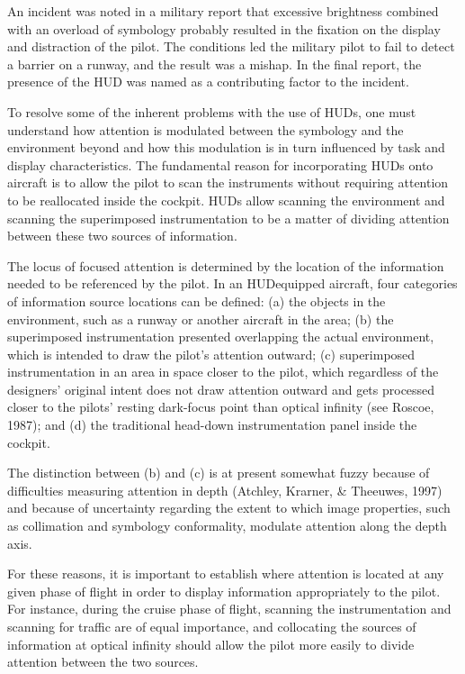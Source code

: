 \documentclass[utf8,bachelor,manualbib]{gradu3}
\begin{document}
An incident was noted in a military report that excessive brightness combined with an overload of symbology probably resulted in the fixation on the display and distraction of the pilot. The conditions led the military pilot to fail to detect a barrier on a runway, and the result was a mishap. In the final report, the presence of the HUD was named as a contributing factor to the incident.






To resolve some of the inherent problems with the use of HUDs, one must understand how attention is modulated between the symbology and the environment beyond and how this modulation is in turn influenced by task and display characteristics. The fundamental reason for incorporating HUDs onto aircraft is to allow the pilot to scan the instruments without requiring attention to be reallocated inside the cockpit. HUDs allow scanning the environment and scanning the superimposed instrumentation to be a matter of dividing attention between these two sources of information.

The locus of focused attention is determined by the location of the information needed to be referenced by the pilot. In an HUDequipped aircraft, four categories of information source locations can be defined: (a) the objects in the environment, such as a runway or another aircraft in the area; (b) the superimposed instrumentation presented overlapping the actual environment, which is intended to draw the pilot's attention outward; (c) superimposed instrumentation in an area in space closer to the pilot, which regardless of the designers' original intent does not draw attention outward and gets processed closer to the pilots' resting dark-focus point than optical infinity (see Roscoe, 1987); and (d) the traditional head-down instrumentation panel inside the cockpit.

The distinction between (b) and (c) is at present somewhat fuzzy because of difficulties measuring attention in depth (Atchley, Krarner, \& Theeuwes, 1997) and because of uncertainty regarding the extent to which image properties, such as collimation and symbology conformality, modulate attention along the depth axis.

For these reasons, it is important to establish where attention is located at any given phase of flight in order to display information appropriately to the pilot. For instance, during the cruise phase of flight, scanning the instrumentation and scanning for traffic are of equal importance, and collocating the sources of information at optical infinity should allow the pilot more easily to divide attention between the two sources.
\end{document}
